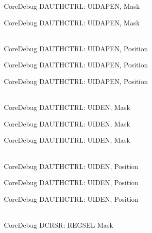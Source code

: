 \begin{DoxyRefList}
\label{deprecated__deprecated000533}%
%
Core\+Debug DAUTHCTRL:\+ UIDAPEN, Mask 

\label{deprecated__deprecated000635}%
%
Core\+Debug DAUTHCTRL:\+ UIDAPEN, Mask  
\item[{\parbox[t]{\linewidth}{Global \doxylink{group__CMSIS__SCB_ga57a2ef70f6cc1e0903a8c3740512de46}{Core\+Debug\+\_\+\+DAUTHCTRL\+\_\+\+UIDAPEN\+\_\+\+Pos} }}]\hfill \\
\label{deprecated__deprecated000081}%
%
Core\+Debug DAUTHCTRL:\+ UIDAPEN, Position 

\label{deprecated__deprecated000532}%
%
Core\+Debug DAUTHCTRL:\+ UIDAPEN, Position 

\label{deprecated__deprecated000634}%
%
Core\+Debug DAUTHCTRL:\+ UIDAPEN, Position  
\item[{\parbox[t]{\linewidth}{Global \doxylink{group__CMSIS__SCB_ga7d84e1642469f5c20b7ef7fa76a4fe95}{Core\+Debug\+\_\+\+DAUTHCTRL\+\_\+\+UIDEN\+\_\+\+Msk} }}]\hfill \\
\label{deprecated__deprecated000080}%
%
Core\+Debug DAUTHCTRL:\+ UIDEN, Mask 

\label{deprecated__deprecated000531}%
%
Core\+Debug DAUTHCTRL:\+ UIDEN, Mask 

\label{deprecated__deprecated000633}%
%
Core\+Debug DAUTHCTRL:\+ UIDEN, Mask  
\item[{\parbox[t]{\linewidth}{Global \doxylink{group__CMSIS__SCB_gab9cb997565a842f5eb9365bd58d7cda2}{Core\+Debug\+\_\+\+DAUTHCTRL\+\_\+\+UIDEN\+\_\+\+Pos} }}]\hfill \\
\label{deprecated__deprecated000079}%
%
Core\+Debug DAUTHCTRL:\+ UIDEN, Position 

\label{deprecated__deprecated000530}%
%
Core\+Debug DAUTHCTRL:\+ UIDEN, Position 

\label{deprecated__deprecated000632}%
%
Core\+Debug DAUTHCTRL:\+ UIDEN, Position  
\item[{\parbox[t]{\linewidth}{Global \doxylink{group__CMSIS__CoreDebug_ga17cafbd72b55030219ce5609baa7c01d}{Core\+Debug\+\_\+\+DCRSR\+\_\+\+REGSEL\+\_\+\+Msk} }}]\hfill \\
\label{deprecated__deprecated000044}%
%
Core\+Debug DCRSR:\+ REGSEL Mask 


\end{DoxyRefList}
